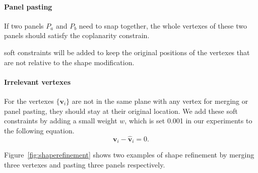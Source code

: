{\paragraph{Panel pasting}
If two panels $P_a$ and $P_b$ need to snap together, the whole vertexes of these two panels should satisfy the coplanarity constrain. 



 soft constraints will be added to keep the original positions of the vertexes that are not relative to the shape modification.

\paragraph{Irrelevant vertexes} For the vertexes $\{\mathbf{v}_i\}$ are not in the same plane with any vertex for merging or panel pasting, they should stay at their original location. 
We add these soft constraints by adding a small weight $w$, which is set 0.001 in our experiments to the following equation. 
\begin{equation}
\mathbf{v}_i - \mathbf{\hat{v}}_i = 0.
\label{equ:irrelevant}
\end{equation}

Figure~\ref{fig:shaperefinement} shows two examples of shape refinement by merging three vertexes and pasting three panels respectively. 

}
